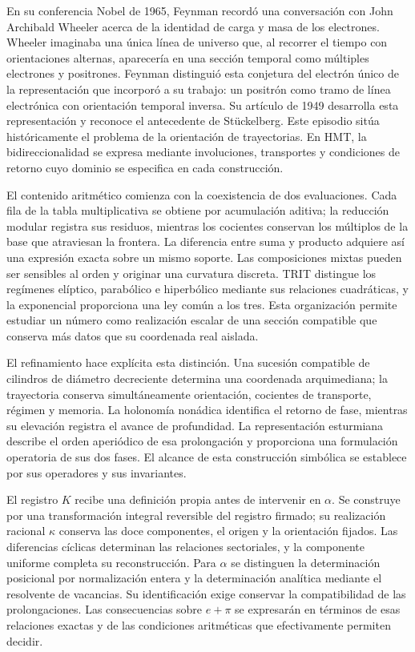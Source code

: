 En su conferencia Nobel de 1965, Feynman recordó una conversación con
John Archibald Wheeler acerca de la identidad de carga y masa de los
electrones\cite{feynman1965}. Wheeler imaginaba una única línea de universo
que, al recorrer el tiempo con orientaciones alternas, aparecería en una
sección temporal como múltiples electrones y positrones. Feynman distinguió
esta conjetura del electrón único de la representación que incorporó a
su trabajo: un positrón como tramo de línea electrónica con orientación
temporal inversa. Su artículo de 1949 desarrolla esta representación y
reconoce el antecedente de Stückelberg\cite{feynman1949}. Este episodio
sitúa históricamente el problema de la orientación de trayectorias. En HMT,
la bidireccionalidad se expresa mediante involuciones, transportes y
condiciones de retorno cuyo dominio se especifica en cada construcción.

El contenido aritmético comienza con la coexistencia de dos evaluaciones.
Cada fila de la tabla multiplicativa se obtiene por acumulación aditiva;
la reducción modular registra sus residuos, mientras los cocientes conservan
los múltiplos de la base que atraviesan la frontera. La diferencia entre
suma y producto adquiere así una expresión exacta sobre un mismo soporte.
Las composiciones mixtas pueden ser sensibles al orden y originar una
curvatura discreta. TRIT distingue los regímenes elíptico, parabólico e
hiperbólico mediante sus relaciones cuadráticas, y la exponencial proporciona
una ley común a los tres. Esta organización permite estudiar un número
como realización escalar de una sección compatible que conserva más datos
que su coordenada real aislada.

El refinamiento hace explícita esta distinción. Una sucesión compatible de
cilindros de diámetro decreciente determina una coordenada arquimediana;
la trayectoria conserva simultáneamente orientación, cocientes de transporte,
régimen y memoria. La holonomía nonádica identifica el retorno de fase,
mientras su elevación registra el avance de profundidad. La representación
esturmiana describe el orden aperiódico de esa prolongación y proporciona
una formulación operatoria de sus dos fases. El alcance de esta construcción
simbólica se establece por sus operadores y sus invariantes.

El registro \(K\) recibe una definición propia antes de intervenir en
\(\alpha\). Se construye por una transformación integral reversible del
registro firmado; su realización racional \(\kappa\) conserva las doce
componentes, el origen y la orientación fijados. Las diferencias cíclicas
determinan las relaciones sectoriales, y la componente uniforme completa
su reconstrucción. Para \(\alpha\) se distinguen la determinación posicional
por normalización entera y la determinación analítica mediante el resolvente
de vacancias. Su identificación exige conservar la compatibilidad de las
prolongaciones. Las consecuencias sobre \(e+\pi\) se expresarán en términos
de esas relaciones exactas y de las condiciones aritméticas que efectivamente
permiten decidir.

